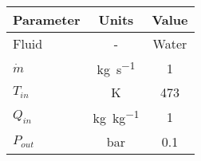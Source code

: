 \begin{tabular}{|p{2.5cm} c c|}
    \hline
    \rowcolor{bluepoli!40} %
    \textbf{Parameter} & \textbf{Units} & \textbf{Value} \T\B \\
    \hline \hline
    Fluid & - & Water \T\B\\
    \(\Dot{m}\)  & \unit{\kg\per\s} & \num{1} \T\B\\
    \(T_{in}\) & \unit{\K} & \num{473} \T\B\\
    \(Q_{in}\) & \unit{\kg\per\kg} & \num{1} \T\B\\
    \(P_{out}\) & \unit{\bar} & \num{0.1} \T\B\\
    \hline
\end{tabular}